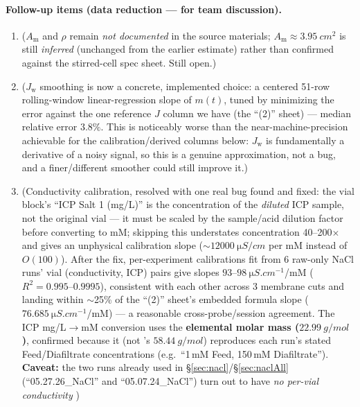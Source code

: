 \documentclass[11pt]{article}
\newcommand{\note}[1]{{\color{blue}\textsf{(#1)}}}
\newcommand{\Jw}{J_{\mathrm{w}}}
\begin{document}
\paragraph{Follow-up items (data reduction --- for team discussion).}
\begin{enumerate}[itemsep=2pt]
  \item \note{$A_{\mathrm m}$ and $\rho$ remain \emph{not documented} in the source
    materials; $A_{\mathrm m}\approx\SI{3.95}{cm^2}$ is still \emph{inferred}
    (unchanged from the earlier estimate) rather than confirmed against the
    stirred-cell spec sheet. Still open.}
  \item \note{$\Jw$ smoothing is now a concrete, implemented choice: a
    centered 51-row rolling-window linear-regression slope of $m(t)$, tuned
    by minimizing the error against the one reference $J$ column we have
    (the ``(2)'' sheet) --- median relative error $3.8\%$. This is
    noticeably worse than the near-machine-precision achievable for the
    calibration/derived columns below: $\Jw$ is fundamentally a derivative
    of a noisy signal, so this is a genuine approximation, not a bug, and a
    finer/different smoother could still improve it.}
  \item \note{Conductivity calibration, resolved with one real bug found and
    fixed: the vial block's ``ICP Salt 1 (mg/L)'' is the concentration of
    the \emph{diluted} ICP sample, not the original vial --- it must be
    scaled by the sample/acid dilution factor before converting to mM;
    skipping this understates concentration 40--200$\times$ and gives an
    unphysical calibration slope ($\sim\SI{12000}{\micro S/cm}$ per mM
    instead of $O(100)$). After the fix, per-experiment calibrations fit
    from 6 raw-only NaCl runs' vial (conductivity, ICP) pairs give slopes
    $93$--$\SI{98}{\micro S.cm^{-1}}$/mM ($R^2=0.995$--$0.9995$), consistent
    with each other across 3 membrane cuts and landing within
    $\sim$25\% of the ``(2)'' sheet's embedded formula slope
    ($\SI{76.685}{\micro S.cm^{-1}}$/mM) --- a reasonable cross-probe/session
    agreement. The ICP mg/L$\to$mM conversion uses the \textbf{elemental
    \ce{Na+} molar mass ($\SI{22.99}{g/mol}$)}, confirmed because it (not
    \ce{NaCl}'s $\SI{58.44}{g/mol}$) reproduces each run's stated
    Feed/Diafiltrate concentrations (e.g.\ ``1\,mM Feed, 150\,mM
    Diafiltrate''). \textbf{Caveat:} the two runs already used in
    \S\ref{sec:nacl}/\S\ref{sec:naclAll} (``05.27.26\_NaCl'' and
    ``05.07.24\_NaCl'') turn out to have \emph{no per-vial conductivity
}}
\end{enumerate}
\end{document}
